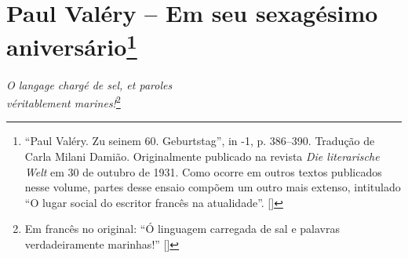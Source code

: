 \chapter{Paul Valéry -- Em seu sexagésimo aniversário\footnote[*]{``Paul Valéry. Zu seinem 60. Geburtstag'', in -1, p. 386--390. Tradução de Carla Milani Damião. Originalmente publicado na revista \emph{Die literarische Welt} em 30 de outubro de 1931. Como ocorre em outros textos publicados nesse volume, partes desse ensaio compõem um outro mais extenso, intitulado ``O lugar social do escritor francês na atualidade''. []}}


\begin{flushright}
{\footnotesize\emph{O langage chargé de sel, et paroles\\ véritablement marines!}}\footnote[\dag]{Em francês no original: ``Ó linguagem carregada de sal e palavras verdadeiramente marinhas!'' []}
\end{flushright}

\bigskip
\bigskip

